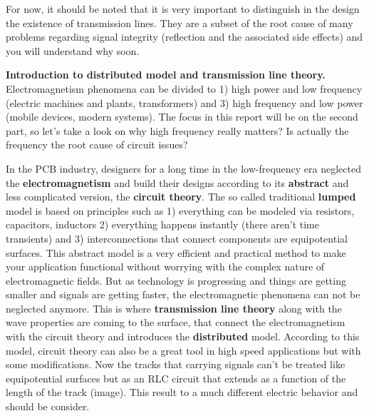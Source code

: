\documentclass[12pt]{article}
\begin{document}

For now, it should be noted that it is very important to distinguish in the design the existence of transmission lines. They are a subset of the root cause of many problems regarding signal integrity (reflection and the associated side effects) and you will understand why soon.

\textbf{Introduction to distributed model and transmission line theory. }
Electromagnetism phenomena can be divided to 1) high power and low frequency (electric machines and plants, transformers) and 3) high frequency and low power (mobile devices, modern systems). The focus in this report will be on the second part, so let's take a look on why high frequency really matters? Is actually the frequency the root cause of circuit issues?

In the PCB industry, designers for a long time in the low-frequency era neglected the \textbf{electromagnetism} and build their designs according to its \textbf{abstract} and less complicated version, the \textbf{circuit theory}. The so called traditional \textbf{lumped} model is based on principles such as 1) everything can be modeled via resistors, capacitors, inductors 2) everything happens instantly (there aren't time transients) and 3) interconnections that connect components are equipotential surfaces. This abstract model is a very efficient and practical method to make your application functional without worrying with the complex nature of electromagnetic fields. But as technology is progressing and things are getting smaller and signals are getting faster, the electromagnetic phenomena can not be neglected anymore. This is where \textbf{transmission line theory} along with the wave properties are coming to the surface, that connect the electromagnetism with the circuit theory and introduces the \textbf{distributed} model. According to this model, circuit theory can also be a great tool in high speed applications but with some modifications. Now the tracks that carrying signals can't be treated like equipotential surfaces but as an RLC circuit that extends as a function of the length of the track (image). This result to a much different electric behavior and should be consider. 
\end{document}
